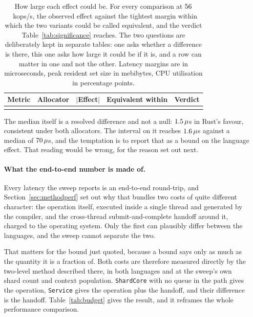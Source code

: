 \documentclass[english,oneside,a4paper,censored,csm,software-track-2020]{HYthesisML}
\begin{document}
\begin{table}[tp]
\centering
\small
\caption[How large each effect could be, for the comparisons the tests do not resolve]{How large each effect could be. For every comparison at $56$~kops/s, the
observed effect against the tightest margin within which the two variants could be called
equivalent, and the verdict Table~\ref{tab:significance} reaches. The two questions are
deliberately kept in separate tables: one asks whether a difference is there, this one asks how
large it could be if it is, and a row can matter in one and not the other. Latency margins are
in microseconds, peak resident set size in mebibytes, CPU utilisation in percentage
points.\label{tab:equivalence}}
\begin{tabular}{@{}l l r r l@{}}
\hline\hline
Metric & Allocator & $|$Effect$|$ & Equivalent within & Verdict \\
\hline
\\
\hline
\end{tabular}
\end{table}

The median itself is a resolved difference and not a null: $1.5\,\mu$s
in Rust's favour, consistent under both allocators. The interval on it reaches
$1.6\,\mu$s against a median of $70\,\mu$s, and the temptation is to report
that as a bound on the language effect. That reading would be wrong, for the reason set out
next.

\paragraph{What the end-to-end number is made of.}\label{sec:budget}
Every latency the sweep reports is an end-to-end round-trip, and
Section~\ref{sec:methodperf} set out why that bundles two costs of quite different character: the
operation itself, executed inside a single thread and generated by the compiler, and the
cross-thread submit-and-complete handoff around it, charged to the operating system. Only the
first can plausibly differ between the languages, and the sweep cannot separate the two.

That matters for the bound just quoted, because a bound says only as much as the quantity
it is a fraction of. Both costs are therefore measured directly by the two-level method described
there, in both languages and at the sweep's own shard count and context population.
\texttt{ShardCore} with no queue in the path gives the operation, \texttt{Service} gives the
operation plus the handoff, and their difference is the handoff.
Table~\ref{tab:budget} gives the result, and it reframes the whole performance comparison.
\end{document}
